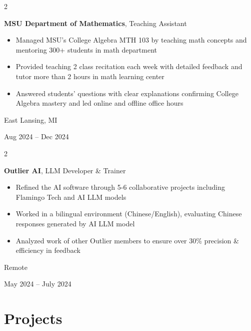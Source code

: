 \documentclass[10pt, letterpaper]{article}
\newenvironment{highlights}{
    \begin{itemize}[
        topsep=0.10 cm,
        parsep=0.10 cm,
        partopsep=0pt,
        itemsep=0pt,
        leftmargin=0.4 cm + 10pt
    ]
}{
    \end{itemize}
} %
\newenvironment{twocolentry}[2][]{
    \onecolentry
    \def\secondColumn{#2}
    \setcolumnwidth{\fill, 4.5 cm}
    \begin{paracol}{2}
}{
    \switchcolumn \raggedleft \secondColumn
    \end{paracol}
    \endonecolentry
} %
\begin{document}
        \vspace{0.2 cm}

        \begin{twocolentry}{
            East Lansing, MI

        Aug 2024 – Dec 2024
        }
            \textbf{MSU Department of Mathematics}, Teaching Assistant
            \begin{highlights}
                \item Managed MSU’s College Algebra MTH 103 by teaching math concepts and mentoring 300+ students in math department
                \item Provided teaching 2 class recitation each week with detailed feedback and tutor more than 2 hours in math learning center
                \item Answered students' questions with clear explanations confirming College Algebra mastery and led online and offline office hours
            \end{highlights}
        \end{twocolentry}


        \vspace{0.2 cm}

        \begin{twocolentry}{
            Remote

        May 2024 – July 2024
        }
            \textbf{Outlier AI}, LLM Developer \& Trainer
            \begin{highlights}
                \item Refined the AI software through 5-6 collaborative projects including Flamingo Tech and AI LLM models
                \item Worked in a bilingual environment (Chinese/English), evaluating Chinese responses generated by AI LLM model
                \item Analyzed work of other Outlier members to ensure over 30\% precision \& efficiency in feedback
            \end{highlights}
        \end{twocolentry}



    
    \section{Projects}
\end{document}
